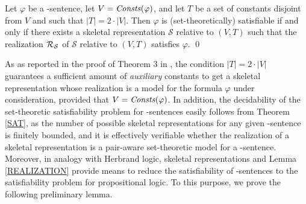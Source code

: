 \documentclass[a4paper]{llncs}
\newcommand{\atset}{\mathcal{S}}
\begin{document}
\begin{theorem}\label{SAT}
Let $\varphi$ be a \Forallpizero-sentence, let $V=\mathit{Consts}(\varphi)$,
and let $T$ be a set of constants disjoint from $V$ and such that
$|T|=2\cdot|V|$. Then $\varphi$ is (set-theoretically) satisfiable
if and only if there exists a skeletal representation $\atset$
relative to $(V,T)$ such that the realization $\Realization_{\!\atset}$
of $\atset$ relative to $(V,T)$ satisfies $\varphi$. \qed
\end{theorem}
%
As as reported in the proof of Theorem 3 in \cite{CanLonNic2011},
the condition $|T|=2\cdot|V|$ guarantees a sufficient amount of 
\emph{auxiliary} constants to get a skeletal representation whose realization
is a model for the formula $\varphi$ under consideration, provided that 
$V=\mathit{Consts}(\varphi)$. 
In addition, the decidability of the set-theoretic satisfiability problem for
\Forallpizero-sentences easily follows from Theorem \ref{SAT}, as the
number of possible skeletal representations for any given
\Forallpizero-sentence is finitely bounded, and it is effectively
verifiable whether the realization of a skeletal representation is a
pair-aware set-theoretic model for a \Forallpizero-sentence.
Moreover, in analogy with Herbrand logic, skeletal representations
and Lemma \ref{REALIZATION} provide means to reduce the satisfiability
of \Forallpizero-sentences to the satisfiability problem for 
propositional logic. To this purpose, we prove the following 
preliminary lemma.
\end{document}
